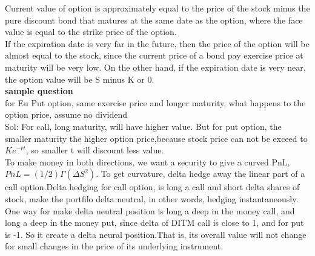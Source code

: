 \documentclass[a4paper,11pt]{article}
\begin{document}
Current value of option is approximately equal to the price of the stock minus the pure discount bond that matures at the same date as the option, where the face value is equal to the strike price of the option. \\
If the expiration date is very far in the future, then the price of the option will be almost equal to the stock, since the current price of a bond pay exercise price at maturity will be very low. On the other hand, if the expiration date is very near, the option value will be S minus K or 0.\\
{\bf sample question}\\
for Eu Put option, same exercise price and longer maturity, what happens to the option price, assume no dividend\\
Sol: For call, long maturity, will have higher value. But for put option, the smaller maturity the higher option price,because stock price can not be exceed to $Ke^{-rt}$, so smaller t will discount less value.\\
To make money in both directions, we want a security to give a curved PnL, $PnL=(1/2)\Gamma (\Delta S^2)$. To get curvature, delta hedge away the linear part of a call option.Delta hedging for call option, is long a call and short delta shares of stock, make the portfilo delta neutral, in other words, hedging instantaneously. One way for make delta neutral position is long a deep in the money call, and long a deep in the money put, since delta of DITM call is close to 1, and for put is -1. So it create a delta neural position.That is, its overall value will not change for small changes in the price of its underlying instrument.
\end{document}
